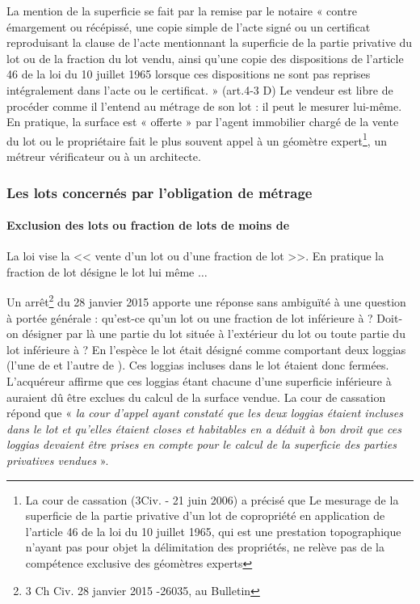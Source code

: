 			\par La mention de la superficie se fait par la remise par le notaire « contre émargement ou récépissé, une copie
			simple de l'acte signé ou un certificat reproduisant la clause de l'acte mentionnant la superficie de la partie
			privative du lot ou de la fraction du lot vendu, ainsi qu'une copie des dispositions de l'article 46 de la loi du
			10 juillet 1965 lorsque ces dispositions ne sont pas reprises intégralement dans l'acte ou le certificat. »
			(art.4-3 D)
			Le vendeur est libre de procéder comme il l'entend au métrage de son lot : il peut le mesurer lui-même.
			En pratique, la surface est « offerte » par l’agent immobilier chargé de la vente du lot ou le propriétaire
			fait le plus souvent appel à un géomètre expert\footnote{
				La cour de cassation (3\ieme Civ. - 21 juin 2006) a précisé que Le mesurage de la superficie de la partie privative d'un lot de copropriété en application de l'article 46 de la loi du 10 juillet 1965, qui est une prestation topographique n'ayant pas pour objet la délimitation des	propriétés, ne relève pas de la compétence exclusive des géomètres experts
			}, un métreur vérificateur ou à un architecte.
			
		\subsubsection{Les lots concernés par l'obligation de métrage}
			
			\paragraph{Exclusion des lots ou fraction de lots de moins de }
			
			\par La loi vise la << vente d'un lot ou d'une fraction de lot >>. En pratique la fraction de lot désigne le lot lui même $\dots$
			
			Un arrêt\footnote{3\ieme{} Ch Civ. 28 janvier 2015 -26035, au Bulletin} du 28 janvier 2015 apporte une réponse sans ambiguïté à une question à portée générale :
			qu’est-ce qu’un lot ou une fraction de lot inférieure à  ? Doit-on désigner par là une partie du lot située à l’extérieur du lot ou toute partie du lot inférieure à  ? En l’espèce le lot était désigné comme comportant deux loggias (l’une de  et l’autre de ). Ces loggias incluses dans le lot étaient	donc fermées. L’acquéreur affirme que ces loggias étant chacune d’une superficie inférieure à 	auraient dû être exclues du calcul de la surface vendue. La cour de cassation répond que « \emph{la cour d’appel ayant constaté que les deux loggias étaient incluses dans le lot et qu’elles étaient closes et habitables en a déduit à bon droit que ces loggias devaient être prises en compte pour le calcul de la superficie des parties	privatives vendues} ».
			
